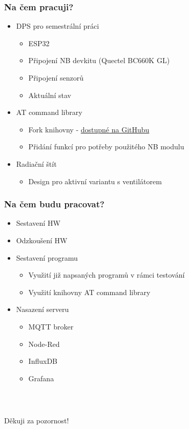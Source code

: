 \documentclass[%
  12pt,       				%
	t,                  %
	aspectratio=1610,   %
	unicode,						%
]{beamer}				    	%
\begin{document}
\begin{frame} 
	\frametitle{Na čem pracuji?}
	\begin{itemize}
			\item DPS pro semestrální práci
                \begin{itemize}
		          \item ESP32
			        \item Připojení NB devkitu (Quectel BC660K GL)
                    \item Připojení senzorů
                    \item Aktuální stav
				\end{itemize}
            \item AT command library
                \begin{itemize}
					\item Fork knihovny - \href{https://github.com/R4sp1/AT-Command-Library}{dostupné na GitHubu}
					\item Přidání funkcí pro potřeby použitého NB modulu
				\end{itemize}
            \item Radiační štít
                \begin{itemize}
					\item Design pro aktivní variantu s ventilátorem
				\end{itemize}
	\end{itemize}
\end{frame}


\begin{frame} 
	\frametitle{Na čem budu pracovat?}
	\begin{itemize}
			\item Sestavení HW
            \item Odzkoušení HW
            \item Sestavení programu
                \begin{itemize}
                    \item Využití již napsaných programů v rámci testování
                    \item Využití knihovny AT command library
                \end{itemize}
            \item Nasazení serveru
                \begin{itemize}
                    \item MQTT broker
                    \item Node-Red
                    \item InfluxDB
                    \item Grafana
                \end{itemize}
	\end{itemize}
\end{frame}

\begin{frame}[c] 
	\frametitle{\mbox{ }}
	\begin{center}
		{\Huge Děkuji za pozornost!}
	\end{center}
\end{frame}
\end{document}
